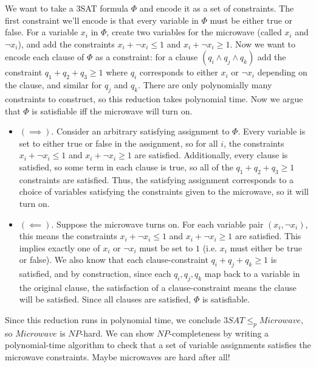 \documentclass[fleqn]{article}
\begin{document}
\begin{enumerate}
    \begin{answer}
        We want to take a 3SAT formula $\Phi$ and encode it as a set of constraints. The first constraint we'll encode is that every variable in $\Phi$ must be either true or false. For a variable $x_i$ in $\Phi$, create two variables for the microwave (called $x_i$ and $\neg x_i$), and add the constraints $x_i + \neg x_i \leq 1$ and $x_i + \neg x_i \geq 1$. Now we want to encode each clause of $\Phi$ as a constraint: for a clause $(q_i \wedge q_j \wedge q_k)$ add the constraint $q_1 + q_2 + q_3 \geq 1$ where $q_i$ corresponds to either $x_i$ or $\neg x_i$ depending on the clause, and similar for $q_j$ and $q_k$. There are only polynomially many constraints to construct, so this reduction takes polynomial time. Now we argue that $\Phi$ is satisfiable iff the microwave will turn on.
        \begin{itemize}
            \item $(\implies)$. Consider an arbitrary satisfying assignment to $\Phi$. Every variable is set to either true or false in the assignment, so for all $i$, the constraints $x_i + \neg x_i \leq 1$ and $x_i + \neg x_i \geq 1$ are satisfied. Additionally, every clause is satisfied, so some term in each clause is true, so all of the $q_1 + q_2 + q_3 \geq 1$ constraints are satisfied. Thus, the satisfying assignment corresponds to a choice of variables satisfying the constraints given to the microwave, so it will turn on.
            \item $(\impliedby)$. Suppose the microwave turns on. For each variable pair $(x_i, \neg x_i)$, this means the constraints $x_i + \neg x_i \leq 1$ and $x_i + \neg x_i \geq 1$ are satisfied. This implies exactly one of $x_i$ or $\neg x_i$ must be set to $1$ (i.e. $x_i$ must either be true or false). We also know that each clause-constraint $q_i + q_j + q_k \geq 1$ is satisfied, and by construction, since each $q_i, q_j, q_k$ map back to a variable in the original clause, the satisfaction of a clause-constraint means the clause will be satisfied. Since all clauses are satisfied, $\Phi$ is satisfiable.
        \end{itemize}
        Since this reduction runs in polynomial time, we conclude $3SAT \leq_p Microwave$, so $Microwave$ is $NP$-hard. We can show $NP$-completeness by writing a polynomial-time algorithm to check that a set of variable assignments satisfies the microwave constraints. Maybe microwaves are hard after all!
    \end{answer}

\end{enumerate}
\end{document}
